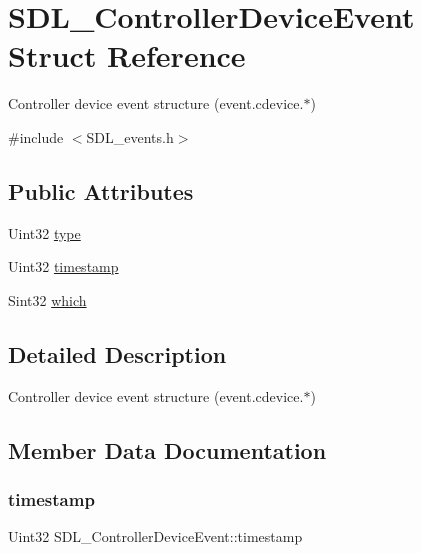 \hypertarget{structSDL__ControllerDeviceEvent}{}\section{S\+D\+L\+\_\+\+Controller\+Device\+Event Struct Reference}
\label{structSDL__ControllerDeviceEvent}


Controller device event structure (event.\+cdevice.$\ast$)  




{\ttfamily \#include $<$S\+D\+L\+\_\+events.\+h$>$}

\subsection*{Public Attributes}
\begin{DoxyCompactItemize}
\item 
Uint32 \hyperlink{structSDL__ControllerDeviceEvent_a45b3807eaf70a5f5cf712455da277536}{type}
\item 
Uint32 \hyperlink{structSDL__ControllerDeviceEvent_a62945795fc17f5000fddc80e2cf921b8}{timestamp}
\item 
Sint32 \hyperlink{structSDL__ControllerDeviceEvent_accb80de1619c1e790cffb6c888c915db}{which}
\end{DoxyCompactItemize}


\subsection{Detailed Description}
Controller device event structure (event.\+cdevice.$\ast$) 

\subsection{Member Data Documentation}
\mbox{\label{structSDL__ControllerDeviceEvent_a62945795fc17f5000fddc80e2cf921b8}} 
\subsubsection{\texorpdfstring{timestamp}{timestamp}}
{\footnotesize\ttfamily Uint32 S\+D\+L\+\_\+\+Controller\+Device\+Event\+::timestamp}

